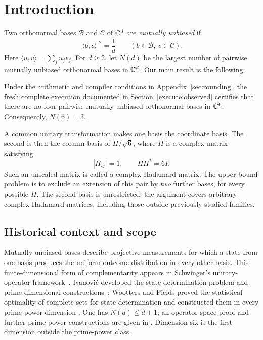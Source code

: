\section{Introduction}\label{sec:introduction}

Two orthonormal bases $\mathcal B$ and $\mathcal C$ of $\mathbb C^d$ are
\emph{mutually unbiased} if
\[
 |\langle b,c\rangle|^2=\frac1d
 \qquad(b\in\mathcal B,\ c\in\mathcal C).
\]
Here $\langle u,v\rangle=\sum_j\overline{u_j}v_j$.
For $d\ge2$, let $N(d)$ be the largest number of pairwise mutually unbiased
orthonormal bases in $\mathbb C^d$. Our main result is the following.

\begin{theorem}\label{thm:main}
Under the arithmetic and compiler conditions in
Appendix~\ref{sec:rounding}, the fresh complete execution documented in
Section~\ref{execute:observed} certifies that there are no four pairwise mutually unbiased orthonormal bases in
$\mathbb C^6$. Consequently, $N(6)=3$.
\end{theorem}

A common unitary transformation makes one basis the coordinate basis.
The second is then the column basis of $H/\sqrt6$, where $H$ is a
complex matrix satisfying
\[
 |H_{ij}|=1,\qquad HH^*=6I.
\]
Such an unscaled matrix is called a complex Hadamard matrix. The
upper-bound problem is to exclude an extension of this pair by
\emph{two} further bases, for every possible $H$. The second basis is
unrestricted: the argument covers arbitrary complex Hadamard matrices,
including those outside previously studied families.

\subsection{Historical context and scope}

Mutually unbiased bases describe projective measurements for which a state
from one basis produces the uniform outcome distribution in every other
basis. This finite-dimensional form of complementarity appears in
Schwinger's unitary-operator framework~\cite{Schwinger1960Unitary}.
Ivanovi\'c developed the state-determination problem and prime-dimensional
constructions~\cite{Ivanovic1981StateDetermination}; Wootters and Fields
proved the statistical optimality of complete sets for state determination
and constructed them in every prime-power dimension
\cite{WoottersFields1989}. One has $N(d)\le d+1$; an operator-space proof
and further prime-power constructions are given in
\cite{BandyopadhyayEtAl2002}. Dimension six is the first dimension outside
the prime-power class.

